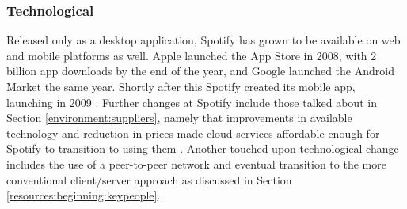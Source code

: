 \subsubsection{Technological}
Released only as a desktop application, Spotify has grown to be available on web and mobile platforms as well. Apple launched the App Store in 2008, with 2 billion app downloads by the end of the year, and Google launched the Android Market the same year. Shortly after this Spotify created its mobile app, launching in 2009 \parencite{apple_app_store_first_weekend, telegraph_top_10_highlights_2009, androind_market_release, spotify_mobile_release}. Further changes at Spotify include those talked about in Section \ref{environment:suppliers}, namely that improvements in available technology and reduction in prices made cloud services affordable enough for Spotify to transition to using them \parencite{spotify_announce_google_cloud}. Another touched upon technological change includes the use of a peer-to-peer network and eventual transition to the more conventional client/server approach as discussed in Section \ref{resources:beginning:keypeople}.